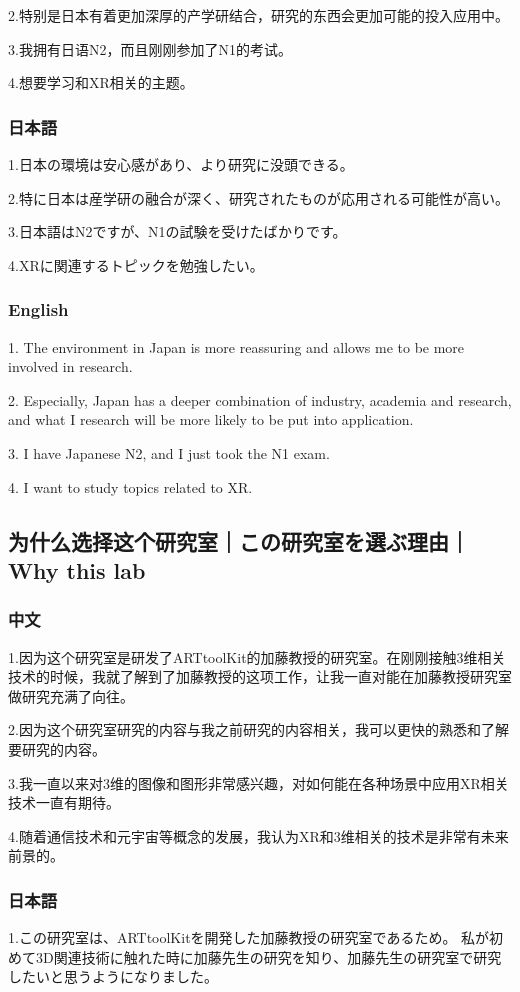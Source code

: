 \documentclass[lang=cn,11pt,a4paper]{elegantpaper}
\begin{document}
2.特别是日本有着更加深厚的产学研结合，研究的东西会更加可能的投入应用中。

3.我拥有日语N2，而且刚刚参加了N1的考试。

4.想要学习和XR相关的主题。
\subsubsection{日本語}
1.日本の環境は安心感があり、より研究に没頭できる。

2.特に日本は産学研の融合が深く、研究されたものが応用される可能性が高い。

3.日本語はN2ですが、N1の試験を受けたばかりです。

4.XRに関連するトピックを勉強したい。
\subsubsection{English}
1. The environment in Japan is more reassuring and allows me to be more involved in research.

2. Especially, Japan has a deeper combination of industry, academia and research, and what I research will be more likely to be put into application.

3. I have Japanese N2, and I just took the N1 exam.

4. I want to study topics related to XR.

\subsection{为什么选择这个研究室｜この研究室を選ぶ理由｜Why this lab}
\subsubsection{中文}
1.因为这个研究室是研发了ARTtoolKit的加藤教授的研究室。在刚刚接触3维相关技术的时候，我就了解到了加藤教授的这项工作，让我一直对能在加藤教授研究室做研究充满了向往。

2.因为这个研究室研究的内容与我之前研究的内容相关，我可以更快的熟悉和了解要研究的内容。

3.我一直以来对3维的图像和图形非常感兴趣，对如何能在各种场景中应用XR相关技术一直有期待。

4.随着通信技术和元宇宙等概念的发展，我认为XR和3维相关的技术是非常有未来前景的。
\subsubsection{日本語}
1.この研究室は、ARTtoolKitを開発した加藤教授の研究室であるため。 私が初めて3D関連技術に触れた時に加藤先生の研究を知り、加藤先生の研究室で研究したいと思うようになりました。
\end{document}
